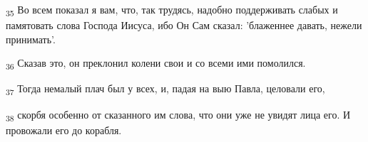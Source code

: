 \begin{tcolorbox}
\textsubscript{35} Во всем показал я вам, что, так трудясь, надобно поддерживать слабых и памятовать слова Господа Иисуса, ибо Он Сам сказал: 'блаженнее давать, нежели принимать'.
\end{tcolorbox}
\begin{tcolorbox}
\textsubscript{36} Сказав это, он преклонил колени свои и со всеми ими помолился.
\end{tcolorbox}
\begin{tcolorbox}
\textsubscript{37} Тогда немалый плач был у всех, и, падая на выю Павла, целовали его,
\end{tcolorbox}
\begin{tcolorbox}
\textsubscript{38} скорбя особенно от сказанного им слова, что они уже не увидят лица его. И провожали его до корабля.
\end{tcolorbox}
